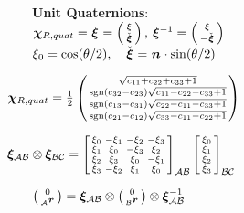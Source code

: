 \documentclass[a4paper, 8pt]{extarticle}
\newcommand{\mvec}[3]{  \prescript{}{\mathcal{#1}}{\bm{#2}}  _{#3} }
\newcommand{\mquat}[1]{ \bm{\xi}_{ \mathcal{#1} } }
\DeclareMathOperator{\sgn}{sgn}
\begin{document}
\begin{multicols*}{3}
\noindent\textbf{Unit Quaternions}:\\
$\mvec{}{\chi}{R,quat} = \mvec{}{\xi}{} = \left(\begin{smallmatrix}
\xi \\
 \check{\mvec{}{\xi}{}}
\end{smallmatrix}\right),\,
 \mvec{}{\xi}{}^{-1} = \left(\begin{smallmatrix}
\xi \\
-\check{\mvec{}{\xi}{}}
\end{smallmatrix}\right)$\\
$\xi_0 = \cos(\theta/2),\quad \check{\mvec{}{\xi}{}} = \mvec{}{n}{}\cdot\sin(\theta/2)$

$\mkern-36mu
\mvec{}{\chi}{R,quat} = \frac{1}{2} 
\left(\begin{smallmatrix}
\sqrt{c_{11} + c_{22} + c_{33} + 1}\\
\sgn(c_{32} - c_{23})\sqrt{c_{11} - c_{22} - c_{33} + 1}\\
\sgn(c_{13} - c_{31})\sqrt{c_{22} - c_{11} - c_{33} + 1}\\
\sgn(c_{21} - c_{12})\sqrt{c_{33} - c_{11} - c_{22} + 1}
\end{smallmatrix}\right)$

$\mkern-36mu
\mquat{AB} \otimes \mquat{BC} = \left[\begin{smallmatrix}
\xi_0  & -\xi_1  & -\xi_2  & -\xi_3 \\
\xi_1  &  \xi_0  & -\xi_3  &  \xi_2 \\
\xi_2  &  \xi_3  &  \xi_0  & -\xi_1 \\
\xi_3  & -\xi_2  &  \xi_1  &  \xi_0
\end{smallmatrix}\right]_{\mathcal{AB}}  \left[\begin{smallmatrix}
\xi_0 \\  \xi_1 \\  \xi_2 \\  \xi_3
\end{smallmatrix}\right]_{\mathcal{BC}}$

$\left(\begin{smallmatrix} 0 \\ \mvec{A}{r}{}\end{smallmatrix}\right) = 
\mquat{AB} \otimes
\left(\begin{smallmatrix} 0 \\ \mvec{B}{r}{}\end{smallmatrix}\right)
\otimes \mquat{AB}^{-1}$



\end{multicols*}
\end{document}
